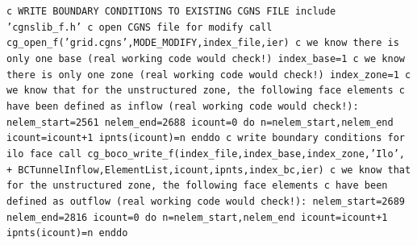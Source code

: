 \documentclass[12pt]{article}
\begin{document}
{\tt \noindent c  WRITE BOUNDARY CONDITIONS TO EXISTING CGNS FILE
\newline\indent      include 'cgnslib\_f.h'
\newline c  open CGNS file for modify
\newline\indent      call cg\_open\_f('grid.cgns',MODE\_MODIFY,index\_file,ier)
\newline c  we know there is only one base (real working code would check!)
\newline\indent      index\_base=1
\newline c  we know there is only one zone (real working code would check!)
\newline\indent      index\_zone=1
\newline c  we know that for the unstructured zone, the following face elements
\newline c  have been defined as inflow (real working code would check!):
\newline\indent      nelem\_start=2561
\newline\indent      nelem\_end=2688
\newline\indent      icount=0
\newline\indent      do n=nelem\_start,nelem\_end
\newline\indent\indent        icount=icount+1
\newline\indent\indent        ipnts(icount)=n
\newline\indent      enddo
\newline c  write boundary conditions for ilo face
\newline\indent      call cg\_boco\_write\_f(index\_file,index\_base,index\_zone,'Ilo',
\newline + \indent BCTunnelInflow,ElementList,icount,ipnts,index\_bc,ier)
\newline c  we know that for the unstructured zone, the following face elements
\newline c  have been defined as outflow (real working code would check!):
\newline\indent      nelem\_start=2689
\newline\indent      nelem\_end=2816
\newline\indent      icount=0
\newline\indent      do n=nelem\_start,nelem\_end
\newline\indent\indent        icount=icount+1
\newline\indent\indent        ipnts(icount)=n
\newline\indent      enddo
}
\end{document}
